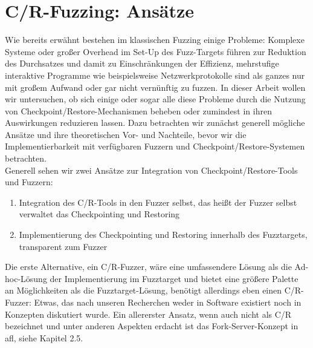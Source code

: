 \documentclass[a4paper]{article}
\begin{document}
\section{C/R-Fuzzing: Ansätze}
Wie bereits erwähnt bestehen im klassischen Fuzzing einige Probleme: Komplexe Systeme oder großer Overhead im Set-Up des Fuzz-Targets führen zur Reduktion des Durchsatzes und damit zu Einschränkungen der Effizienz, mehrstufige interaktive Programme wie beispielsweise Netzwerkprotokolle sind als ganzes nur mit großem Aufwand oder gar nicht vernünftig zu fuzzen. 
In dieser Arbeit wollen wir untersuchen, ob sich einige oder sogar alle diese Probleme durch die Nutzung von Checkpoint/Restore-Mechanismen beheben oder zumindest in ihren Auswirkungen reduzieren lassen. 
Dazu betrachten wir zunächst generell mögliche Ansätze und ihre theoretischen Vor- und Nachteile, bevor wir die Implementierbarkeit mit verfügbaren Fuzzern und Checkpoint/Restore-Systemen betrachten.\\
Generell sehen wir zwei Ansätze zur Integration von Checkpoint/Restore-Tools und Fuzzern:
\begin{enumerate}
    \item Integration des C/R-Tools in den Fuzzer selbst, das heißt der Fuzzer selbst verwaltet das Checkpointing und Restoring
    \item Implementierung des Checkpointing und Restoring innerhalb des Fuzztargets, transparent zum Fuzzer
\end{enumerate}
Die erste Alternative, ein C/R-Fuzzer, wäre eine umfassendere Lösung als die Ad-hoc-Lösung der Implementierung im Fuzztarget und bietet eine größere Palette an Möglichkeiten als die Fuzztarget-Lösung, benötigt allerdings eben einen C/R-Fuzzer: Etwas, das nach unseren Recherchen weder in Software existiert noch in Konzepten diskutiert wurde.
Ein allererster Ansatz, wenn auch nicht als C/R bezeichnet und unter anderen Aspekten erdacht ist das Fork-Server-Konzept in afl\cite{aflrestore}, siehe Kapitel 2.5. \\
\end{document}
